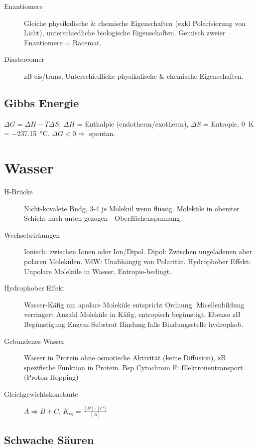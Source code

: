 \documentclass[a4paper,twocolumn,english,fontsize=7,DIV=16]{scrartcl}
\begin{document}
\begin{description}
	\item[Enantiomere] Gleiche physikalische \& chemische Eigenschaften
		(exkl Polarisierung von Licht), unterschiedliche biologische
		Eigenschaften. Gemisch zweier Enantiomere = Racemat.
	\item[Diastereomer] zB cis/trans, Unterschiedliche physikalische \&
		chemische Eigenschaften.
\end{description}

\subsection{Gibbs Energie}

$\Delta G = \Delta H - T \Delta S$, $\Delta H$ = Enthalpie
(endotherm/exotherm), $\Delta S$ = Entropie. \SI{0}{\kelvin} =
\SI{-237.15}{\celsius}. $\Delta G < 0 \Rightarrow$ spontan.

\section{Wasser}

\begin{description}
	\item[H-Brücke] Nicht-kovalete Bndg, 3-4 je  Molekül wenn
		flüssig. Moleküle in oberster Schicht nach unten gezogen -
		Oberflächenspannung.
	\item[Wechselwirkungen] Ionisch: zwischen Ionen oder Ion/Dipol. Dipol:
		Zwischen ungeladenen aber polaren Molekülen. VdW: Unabhängig
		von Polarität. Hydrophober Effekt: Unpolare Moleküle in Wasser,
		Entropie-bedingt.
	\item[Hydrophober Effekt] Wasser-Käfig um apolare Moleküle entspricht
		Ordnung. Micellenbildung verringert Anzahl Moleküle in Käfig,
		entropisch begünstigt. Ebenso zB Begünstigung Enzym-Substrat
		Bindung falls Bindungsstelle hydrophob.
	\item[Gebundenes Wasser] Wasser in Protein ohne osmotische Aktivität
		(keine Diffusion), zB spezifische Funktion in Protein. Bsp
		Cytochrom F: Elektronentransport (Proton Hopping)
	\item[Gleichgewichtskonstante] $A \Rightarrow B + C$, $K_{eq} =
		\frac{[B] \cdot [C]}{[A]}$
\end{description}

\subsection{Schwache Säuren}
\end{document}
